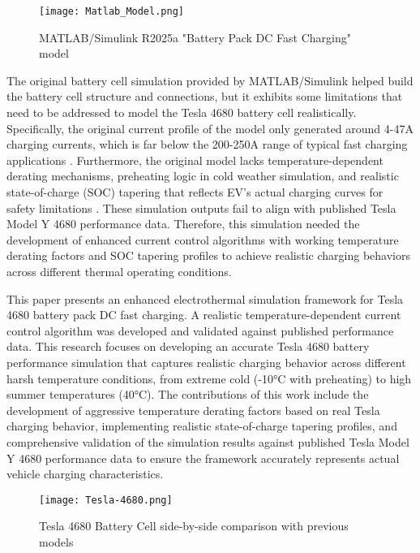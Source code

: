 \documentclass[conference]{IEEEtran}
\begin{document}
\begin{figure}[H]
    \centering
    \texttt{[image: Matlab\_Model.png]}
    \caption{MATLAB/Simulink R2025a "Battery Pack DC Fast Charging" model}
    \label{fig:enter-label}
\end{figure}
The original battery cell simulation provided by MATLAB/Simulink helped build the battery cell structure and connections, but it exhibits some limitations that need to be addressed to model the Tesla 4680 battery cell realistically. Specifically, the original current profile of the model only generated around 4-47A charging currents, which is far below the 200-250A range of typical fast charging applications \cite{sawant} \cite{MASTOI202211504}. Furthermore, the original model lacks temperature-dependent derating mechanisms, preheating logic in cold weather simulation, and realistic state-of-charge (SOC) tapering that reflects EV's actual charging curves for safety limitations \cite{TOMASZEWSKA2019100011}. These simulation outputs fail to align with published Tesla Model Y 4680 performance data. Therefore, this simulation needed the development of enhanced current control algorithms with working temperature derating factors and SOC tapering profiles to achieve realistic charging behaviors across different thermal operating conditions.

This paper presents an enhanced electrothermal simulation framework for Tesla 4680 battery pack DC fast charging. A realistic temperature-dependent current control algorithm was developed and validated against published performance data. This research focuses on developing an accurate Tesla 4680 battery performance simulation that captures realistic charging behavior across different harsh temperature conditions, from extreme cold (-10°C with preheating) to high summer temperatures (40°C). The contributions of this work include the development of aggressive temperature derating factors based on real Tesla charging behavior, implementing realistic state-of-charge tapering profiles, and comprehensive validation of the simulation results against published Tesla Model Y 4680 performance data to ensure the framework accurately represents actual vehicle charging characteristics.

\begin{figure}[H]
    \centering
    \texttt{[image: Tesla-4680.png]}
    \caption{Tesla 4680 Battery Cell side-by-side comparison with previous models \cite{nigel2022tesla}}
    \label{fig:enter-label}
\end{figure}
\end{document}
